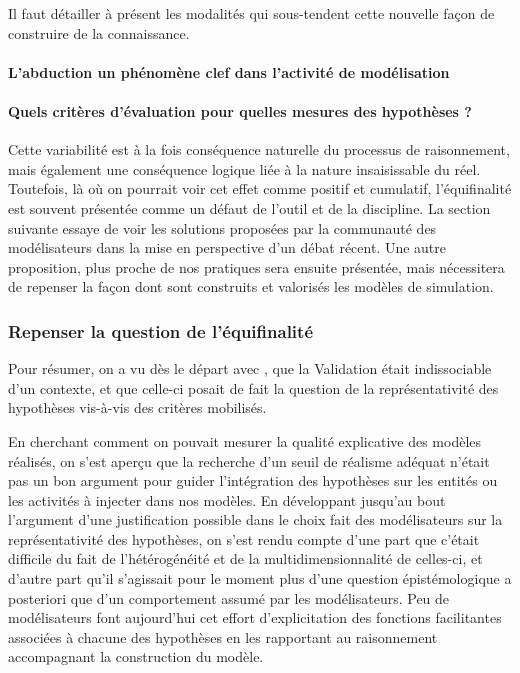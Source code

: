 Il faut détailler à présent les modalités qui sous-tendent cette nouvelle façon de construire de la connaissance.

\paragraph{L'abduction un phénomène clef dans l'activité de modélisation}
\label{p:abduction}



\paragraph{Quels critères d'évaluation pour quelles mesures des hypothèses ?}
\label{p:critere_evaluation}



Cette variabilité est à la fois conséquence naturelle du processus de raisonnement, mais également une conséquence logique liée à la nature insaisissable du réel. Toutefois, là où on pourrait voir cet effet comme positif et cumulatif, l'équifinalité est souvent présentée comme un défaut de l'outil et de la discipline. La section suivante essaye de voir les solutions proposées par la communauté des modélisateurs dans la mise en perspective d'un débat récent. Une autre proposition, plus proche de nos pratiques sera ensuite présentée, mais nécessitera de repenser la façon dont sont construits et valorisés les modèles de simulation. %

\subsubsection{Repenser la question de l'équifinalité}
\label{sssec:equifinalite}

Pour résumer, on a vu dès le départ avec \textcite{Hermann1967}, que la Validation était indissociable d'un contexte, et que celle-ci posait de fait la question de la représentativité des hypothèses vis-à-vis des critères mobilisés.

En cherchant comment on pouvait mesurer la qualité explicative des modèles réalisés, on s'est aperçu que la recherche d'un seuil de réalisme adéquat n'était pas un bon argument pour guider l'intégration des hypothèses sur les entités ou les activités à injecter dans nos modèles. En développant jusqu'au bout l'argument d'une justification possible dans le choix fait des modélisateurs sur la représentativité des hypothèses, on s'est rendu compte d'une part que c'était difficile du fait de l'hétérogénéité et de la multidimensionnalité de celles-ci, et d'autre part qu'il s'agissait pour le moment plus d'une question épistémologique a posteriori que d'un comportement assumé par les modélisateurs. Peu de modélisateurs font aujourd'hui cet effort d'explicitation des fonctions facilitantes associées à chacune des hypothèses en les rapportant au raisonnement accompagnant la construction du modèle.

